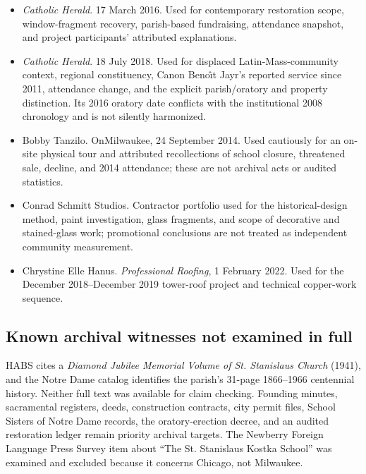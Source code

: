 \begin{itemize}[leftmargin=1.35em,itemsep=0.2em,topsep=0.2em]
\item \emph{Catholic Herald}.  17 March 2016. Used for contemporary restoration scope, window-fragment recovery, parish-based fundraising, attendance snapshot, and project participants' attributed explanations.
\item \emph{Catholic Herald}.  18 July 2018. Used for displaced Latin-Mass-community context, regional constituency, Canon Beno\^{\i}t Jayr's reported service since 2011, attendance change, and the explicit parish/oratory and property distinction. Its 2016 oratory date conflicts with the institutional 2008 chronology and is not silently harmonized.
\item Bobby Tanzilo.  OnMilwaukee, 24 September 2014. Used cautiously for an on-site physical tour and attributed recollections of school closure, threatened sale, decline, and 2014 attendance; these are not archival acts or audited statistics.
\item Conrad Schmitt Studios.  Contractor portfolio used for the historical-design method, paint investigation, glass fragments, and scope of decorative and stained-glass work; promotional conclusions are not treated as independent community measurement.
\item Chrystine Elle Hanus.  \emph{Professional Roofing}, 1 February 2022. Used for the December 2018--December 2019 tower-roof project and technical copper-work sequence.
\end{itemize}

\subsection{Known archival witnesses not examined in full}

HABS cites a \emph{Diamond Jubilee Memorial Volume of St. Stanislaus Church} (1941), and the Notre Dame catalog identifies the parish's 31-page 1866--1966 centennial history. Neither full text was available for claim checking. Founding minutes, sacramental registers, deeds, construction contracts, city permit files, School Sisters of Notre Dame records, the oratory-erection decree, and an audited restoration ledger remain priority archival targets. The Newberry Foreign Language Press Survey item about ``The St. Stanislaus Kostka School'' was examined and excluded because it concerns Chicago, not Milwaukee.

\endgroup
